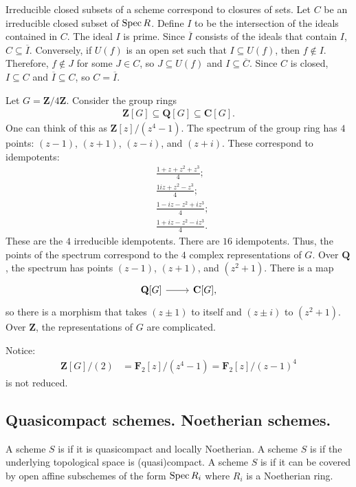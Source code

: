 \documentclass [11 pt, oneside] {article}
\begin{document}
Irreducible closed subsets of a scheme correspond to closures of sets. Let $C$ be an irreducible closed subset of $\operatorname{Spec} R$. Define $I$ to be the intersection of the ideals contained in $C$. The ideal $I$ is prime. Since $\overline{I}$ consists of the ideals that contain $I$, $C\subseteq \overline{I}$. Conversely, if $U(f)$ is an open set such that $I\subseteq U(f)$, then $f\notin I$. Therefore, $f\notin J$ for some $J\in C$, so $J\subseteq U(f)$ and $I\subseteq \overline{C}$. Since $C$ is closed, $I\subseteq C$ and $\overline{I}\subseteq C$, so $C=\overline{I}$.

\begin{example}[ ]\label{}\text{}
Let $G=\mathbf{Z}/4\mathbf{Z}$. Consider the group rings
\begin{align*}
	\mathbf{Z}[G] \subseteq \mathbf{Q}[G] \subseteq \mathbf{C}[G].
\end{align*}
One can think of this as $\mathbf{Z}[z]/(z^4-1)$. The spectrum of the group ring has $4$ points: $(z-1)$, $(z+1)$, $(z-i)$, and $(z+i)$. These correspond to idempotents:
\begin{align*}
	&\frac{1+z+z^2+z^3}{4};\\
	&\frac{1iz+z^2-z^3}{4};\\
	&\frac{1 -iz-z^2 + iz^3}{4};\\
	&\frac{1+iz-z^2-iz^3}{4}.
\end{align*}
These are the $4$ irreducible idempotents. There are $16$ idempotents. 
Thus, the points of the spectrum correspond to the $4$ complex representations of $G$. Over $\mathbf{Q}$, the spectrum has points $(z-1)$, $(z+1)$, and $(z^2+1)$. There is a map
\[
\begin{tikzcd}
\mathbf{Q}[G] \ar[r]& \mathbf{C}[G],
\end{tikzcd}
\]
so there is a morphism that takes $(z\pm1)$ to itself and $(z\pm i)$ to $(z^2+1)$. Over $\mathbf{Z}$, the representations of $G$ are complicated.
\end{example}

\begin{remark}
	Notice:
	\begin{align*}
		\mathbf{Z}[G] / (2) &=  \mathbf{F}_{2}[z]/(z^4-1) =  \mathbf{F}_{2}[z] /(z-1)^4
	\end{align*}
	is not reduced.
\end{remark}

\subsection{Quasicompact schemes. Noetherian schemes.}
A scheme $S$ is  if it is quasicompact and locally Noetherian. A scheme $S$ is  if the underlying topological space is (quasi)compact. A scheme $S$ is  if it can be covered by open affine subschemes of the form $\operatorname{Spec} R_i$ where $R_i$ is a Noetherian ring.
\end{document}
